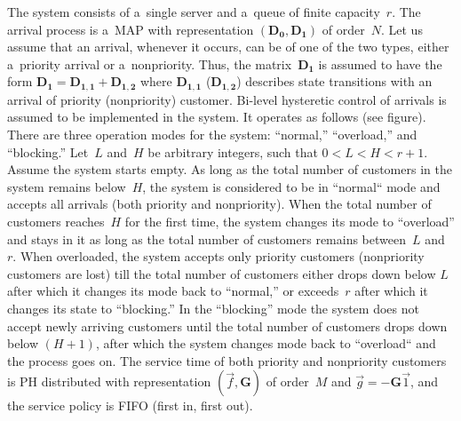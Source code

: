 \begin{multicols}{2}
\noindent
The system consists of a~single server and a~queue of finite capacity~$r$.
The arrival process is a~MAP with representation $(\mathbf{D_0}, \mathbf{D_1})$ 
of order~$N$.
Let us assume that an arrival, whenever it occurs, can be of one of the two types, either 
a~priority arrival or a~nonpriority. Thus, the matrix~$\mathbf{D_1}$ is assumed to
have the form $\mathbf{D_1}=\mathbf{D_{1,1}}+\mathbf{D_{1,2}}$
where $\mathbf{D_{1,1}}$ ($\mathbf{D_{1,2}}$) describes state transitions with an 
arrival of
priority (nonpriority) customer. Bi-level hysteretic control of 
arrivals is assumed to be implemented in the system. It operates as follows (see figure).
There are three operation modes for the system: ``normal,'' ``overload,'' 
and ``blocking.''
 Let~$L$ and~$H$ be arbitrary integers,
such that $0 < L < H < r+1$. Assume the system starts empty. 
As long as the total
number of customers in the system remains below~$H$,
the system is considered to be in ``normal`` mode and accepts 
all arrivals (both priority and nonpriority). 
When the total number of customers reaches~$H$ for the first time, the
system changes its mode to ``overload'' and stays in it as long
as the total number of customers remains between~$L$ and~$r$.
When overloaded, the system accepts only priority customers (nonpriority customers 
are lost)
till the total number of customers either
drops down below $L$ after which it changes its mode back to
``normal,'' or exceeds~$r$ after which it changes its state
to ``blocking.'' In the ``blocking'' mode the system does not accept
newly arriving customers until the total number of customers
drops down below $(H+1)$, after which the system changes mode 
back to ``overload`` and the process goes on.
The service time of both priority and
nonpriority customers is PH distributed with representation
$(\vec{f}, \mathbf{G})$ of order~$M$ and $\vec g=-\mathbf{G}\vec1$, and
the service policy is FIFO (first in, first out).




\end{multicols}
